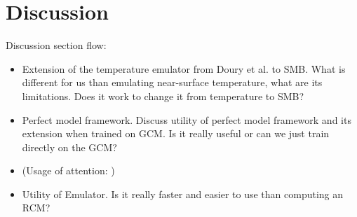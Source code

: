 \documentclass[a4paper,11pt,oneside]{report}
\begin{document}
\chapter{Discussion}
Discussion section flow:
\begin{itemize}
    \item Extension of the temperature emulator from Doury et al. to SMB. What is different for us than emulating near-surface temperature, what are its limitations. Does it work to change it from temperature to SMB? 
    \item Perfect model framework. Discuss utility of perfect model framework and its extension when trained on GCM. Is it really useful or can we just train directly on the GCM?  
    \item (Usage of attention: )
    \item Utility of Emulator. Is it really faster and easier to use than computing an RCM? 
\end{itemize}
\end{document}
